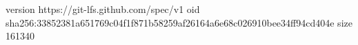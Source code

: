 version https://git-lfs.github.com/spec/v1
oid sha256:33852381a651769c04f1f871b58259af26164a6e68c026910bee34ff94cd404e
size 161340
